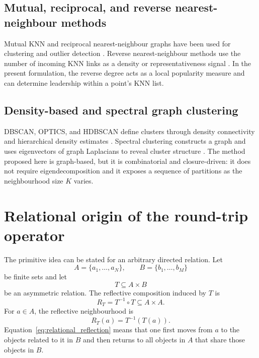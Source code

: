 \documentclass[pdflatex,sn-mathphys-num]{sn-jnl}
\begin{document}
\subsection{Mutual, reciprocal, and reverse nearest-neighbour methods}

Mutual KNN and reciprocal nearest-neighbour graphs have been used for clustering and outlier detection \citep{BritoChavezQuirozYukich1997,GowdaKrishna1978,SardanaBhatnagar2014}. Reverse nearest-neighbour methods use the number of incoming KNN links as a density or representativeness signal \citep{ChowdhuryAmorim2018}. In the present formulation, the reverse degree acts as a local popularity measure and can determine leadership within a point's KNN list.

\subsection{Density-based and spectral graph clustering}

DBSCAN, OPTICS, and HDBSCAN define clusters through density connectivity and hierarchical density estimates \citep{EsterKriegelSanderXu1996,AnkerstBreunigKriegelSander1999,CampelloMoulaviSander2013,CampelloMoulaviZimekSander2015}. Spectral clustering constructs a graph and uses eigenvectors of graph Laplacians to reveal cluster structure \citep{NgJordanWeiss2002,VonLuxburg2007}. The method proposed here is graph-based, but it is combinatorial and closure-driven: it does not require eigendecomposition and it exposes a sequence of partitions as the neighbourhood size $K$ varies.

\section{Relational origin of the round-trip operator}\label{sec:relational_origin}

The primitive idea can be stated for an arbitrary directed relation. Let
\begin{equation}
A=\{a_1,\ldots,a_N\},\qquad B=\{b_1,\ldots,b_M\}
\end{equation}
be finite sets and let
\begin{equation}
T\subseteq A\times B
\end{equation}
be an asymmetric relation. The reflective composition induced by $T$ is
\begin{equation}
R_T=T^{-1}\circ T\subseteq A\times A.
\end{equation}
For $a\in A$, the reflective neighbourhood is
\begin{equation}
R_T(a)=T^{-1}(T(a)).
\label{eq:relational_reflection}
\end{equation}
Equation~\eqref{eq:relational_reflection} means that one first moves from $a$ to the objects related to it in $B$ and then returns to all objects in $A$ that share those objects in $B$.
\end{document}
